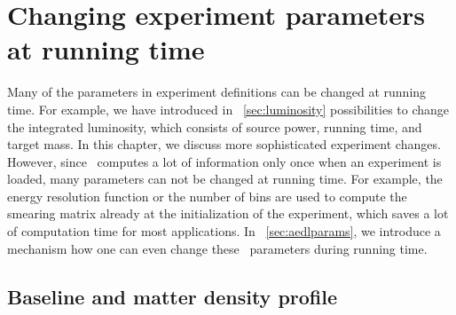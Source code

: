 \chapter{Changing experiment parameters at running time}
\label{chapt:running}

Many of the parameters in experiment definitions can be changed
at running time. For example, we have introduced in 
\Sec~\ref{sec:luminosity} possibilities to change the integrated
luminosity, which consists of source power, running time, and target mass.
In this chapter, we discuss more sophisticated
experiment changes. However, since \GLOBES\ computes a lot of
information only once when an experiment is loaded, many
parameters can not be changed at running time. For example,
the energy resolution function or the number of bins are used
to compute the smearing matrix already at the initialization
of the experiment, which saves a lot of computation
time for most applications. In \Sec~\ref{sec:aedlparams}, we 
introduce a mechanism how one can even change these \AEDL\ parameters
during running time.

\section{Baseline and matter density profile}

